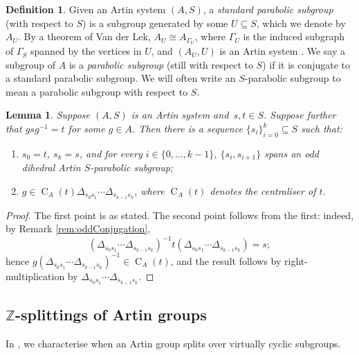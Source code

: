 \documentclass[svgnames]{amsart}
\theoremstyle{plain}
\newtheorem{lemma}[thm]{Lemma}
\theoremstyle{definition}
\newtheorem{defn}[thm]{Definition}
\newcommand{\Z}{\mathbb{Z}}
\newcommand{\centre}[2]{\operatorname{C}_{#1}(#2)}
\begin{document}
\begin{defn}
Given an Artin system $(A,S)$, a \emph{standard parabolic subgroup} (with respect to $S$) is a subgroup generated by some $U \subseteq S$, which we denote by $A_U$. By a theorem of Van der Lek, $A_U \cong A_{\Gamma_U}$, where $\Gamma_U$ is the induced subgraph of $\Gamma_S$ spanned by the vertices in $U$, and $(A_U,U)$ is an Artin system \cite[Theorem~4.13]{VanDerLek}. We say a subgroup of $A$ is a \emph{parabolic subgroup} (still with respect to $S$) if it is conjugate to a standard parabolic subgroup. We will often write an $S$-parabolic subgroup to mean a parabolic subgroup with respect to $S$.
\end{defn}








\begin{lemma}\cite[Corollary 4.2]{Pparabolics}\label{lem:conjugatingStandardGenerators}
    Suppose $(A,S)$ is an Artin system and~$s, t \in S$. Suppose further that $gsg^{-1} = t$ for some $g \in A$. Then there is a sequence $\{s_i\}_{i=0}^k\subseteq S$ such that:
    \begin{enumerate}
        \item $s_0=t$, $s_k=s$, and for every $i\in\{0,\dots,k-1\}$, $\{s_i,s_{i+1}\}$ spans an odd dihedral Artin $S$-parabolic subgroup;
        \item $g\in\centre{A}{t}\Delta_{s_0s_1}\cdots\Delta_{s_{k-1}s_k}$, where $\centre{A}{t}$ denotes the centraliser of $t$.
    \end{enumerate}
\end{lemma}
\begin{proof}
    The first point is \cite[Corollary 4.2]{Pparabolics} as stated. The second point follows from the first: indeed, by Remark \ref{rem:oddConjugation}, $$(\Delta_{s_0s_1}\cdots\Delta_{s_{k-1}s_k})^{-1} t  (\Delta_{s_0s_1}\cdots\Delta_{s_{k-1}s_k}) = s;$$ hence $g(\Delta_{s_0s_1}\cdots\Delta_{s_{k-1}s_k})^{-1} \in \centre{A}{t}$, and the result follows by right-multiplication by  $\Delta_{s_0s_1}\cdots\Delta_{s_{k-1}s_k}$.
\end{proof}

\subsection{\texorpdfstring{$\Z$}{Z}-splittings of Artin groups} In \cite{JonManSar_JSJSpl}, we characterise when an Artin group splits over virtually cyclic subgroups.
\end{document}

